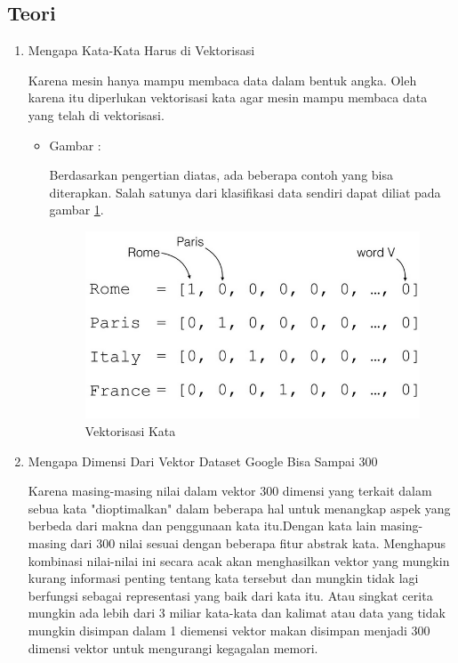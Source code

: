 \subsection{Teori}
\begin{enumerate}
\item Mengapa Kata-Kata Harus di Vektorisasi
\par Karena mesin hanya mampu membaca data dalam bentuk angka. Oleh karena itu diperlukan vektorisasi kata agar mesin mampu membaca data yang telah di vektorisasi. 
\par
\begin{itemize}
\item Gambar :
\par Berdasarkan pengertian diatas, ada beberapa contoh yang bisa diterapkan. Salah satunya dari klasifikasi data sendiri dapat diliat pada gambar \ref{5_1}.
\begin{figure}[!hbtp]
\centering
\includegraphics[scale=0.5]{figures/zulfikar/5/5_1.png}
\caption{Vektorisasi Kata}
\label{5_1}
\end{figure}
\end{itemize}

\item Mengapa Dimensi Dari Vektor Dataset Google Bisa Sampai 300
\par Karena masing-masing nilai dalam vektor 300 dimensi yang terkait dalam sebua kata "dioptimalkan" dalam  beberapa hal untuk menangkap aspek yang  berbeda dari makna dan penggunaan kata itu.Dengan kata lain masing-masing dari 300 nilai sesuai dengan beberapa fitur abstrak kata. Menghapus kombinasi nilai-nilai ini secara acak akan menghasilkan vektor yang mungkin kurang informasi penting tentang kata tersebut dan mungkin tidak lagi berfungsi sebagai representasi yang baik dari kata itu. Atau singkat cerita mungkin ada lebih dari 3 miliar kata-kata dan kalimat atau data yang tidak mungkin disimpan dalam 1 diemensi vektor makan disimpan menjadi 300 dimensi vektor untuk mengurangi kegagalan memori.


\end{enumerate}
